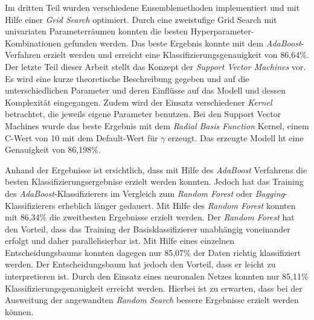 \noindent \hspace*{7mm}
Im dritten Teil wurden verschiedene Ensemblemethoden implementiert und mit Hilfe einer \emph{Grid Search} optimiert. Durch eine zweistufige Grid Search mit univariaten Parameterräumen konnten die besten Hyperparameter-Kombinationen gefunden werden. Das beste Ergebnis konnte mit dem \emph{AdaBoost}-Verfahren erzielt werden und erreicht eine Klassifizierungsgenauigkeit von 86,64\%.\\
\noindent \hspace*{7mm}
Der letzte Teil dieser Arbeit stellt das Konzept der \emph{Support Vector Machines} vor. Es wird eine kurze theoretische Beschreibung gegeben und auf die unterschiedlichen Parameter und deren Einflüsse auf das Modell und dessen Komplexität eingegangen. Zudem wird der Einsatz verschiedener \emph{Kernel} betrachtet, die jeweils eigene Parameter benutzen. Bei den Support Vector Machines wurde das beste Ergebnis mit dem \emph{Radial Basis Function} Kernel, einem C-Wert von 10 mit dem Default-Wert für $\gamma$ erzeugt. Das erzeugte Modell ht eine Genauigkeit von 86,198\%.\\
\noindent \hspace*{7mm}

Anhand der Ergebnisse ist ersichtlich, dass mit Hilfe des  \emph{AdaBoost} Verfahrens die besten Klassifizierungsergebnise erzielt werden konnten. Jedoch hat das Training des  \emph{AdaBoost}-Klassifizierers im Vergleich zum  \emph{Random Forest} oder  \emph{Bagging}-Klassifizierers erheblich länger gedauert. Mit Hilfe des  \emph{Random Forest} konnten mit 86,34\% die zweitbesten Ergebnisse erzielt werden. Der  \emph{Random Forest} hat den Vorteil, dass das Training der Basisklassifizierer unabhängig voneinander erfolgt und daher parallelisierbar ist. Mit Hilfe eines einzelnen Entscheidungsbaums konnten dagegen nur 85,07\% der Daten richtig klassifiziert werden. Der Entscheidungsbaum hat jedoch den Vorteil, dass er leicht zu interpretieren ist. Durch den Einsatz eines neuronalen Netzes konnten nur 85,11\% Klassifizierungsgenauigkeit erreicht werden. Hierbei ist zu erwarten, dass bei der Ausweitung der angewandten \emph{Random Search} bessere Ergebnisse erzielt werden können.    